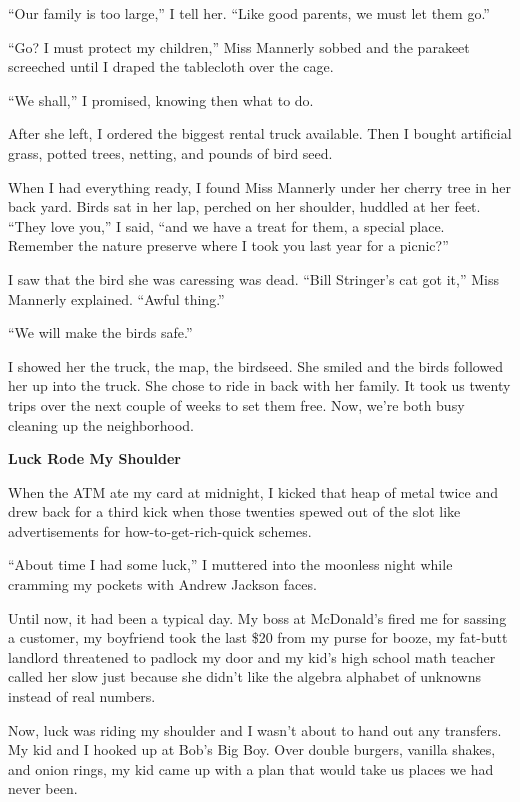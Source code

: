 \documentclass[
]{article}
\begin{document}
``Our family is too large,'' I tell her. ``Like good parents, we must
let them go.''

``Go? I must protect my children,'' Miss Mannerly sobbed and the
parakeet screeched until I draped the tablecloth over the cage.

``We shall,'' I promised, knowing then what to do.

After she left, I ordered the biggest rental truck available. Then I
bought artificial grass, potted trees, netting, and pounds of bird seed.

When I had everything ready, I found Miss Mannerly under her cherry tree
in her back yard. Birds sat in her lap, perched on her shoulder, huddled
at her feet. ``They love you,'' I said, ``and we have a treat for them,
a special place. Remember the nature preserve where I took you last year
for a picnic?''

I saw that the bird she was caressing was dead. ``Bill Stringer's cat
got it,'' Miss Mannerly explained. ``Awful thing.''

``We will make the birds safe.''

I showed her the truck, the map, the birdseed. She smiled and the birds
followed her up into the truck. She chose to ride in back with her
family. It took us twenty trips over the next couple of weeks to set
them free. Now, we're both busy cleaning up the neighborhood.

\textbf{\hfill\break
}

\textbf{Luck Rode My Shoulder}

When the ATM ate my card at midnight, I kicked that heap of metal twice
and drew back for a third kick when those twenties spewed out of the
slot like advertisements for how-to-get-rich-quick schemes.

``About time I had some luck,'' I muttered into the moonless night while
cramming my pockets with Andrew Jackson faces.

Until now, it had been a typical day. My boss at McDonald's fired me for
sassing a customer, my boyfriend took the last \$20 from my purse for
booze, my fat-butt landlord threatened to padlock my door and my kid's
high school math teacher called her slow just because she didn't like
the algebra alphabet of unknowns instead of real numbers.

Now, luck was riding my shoulder and I wasn't about to hand out any
transfers. My kid and I hooked up at Bob's Big Boy. Over double burgers,
vanilla shakes, and onion rings, my kid came up with a plan that would
take us places we had never been.
\end{document}
